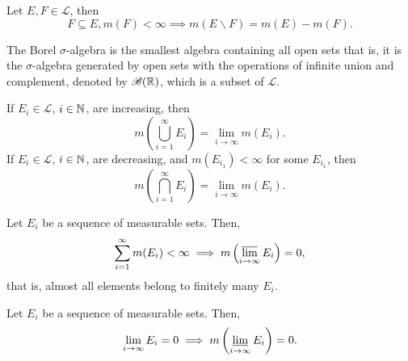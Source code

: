 \documentclass[class=book, crop=false]{standalone}
\begin{document}
    \begin{theorem}[Subtraction]
        Let $E, F \in \mathscr{L}$, then
        \begin{equation*}
            F \subseteq E, m(F) < \infty \implies m(E \backslash F) = m(E) - m(F).
        \end{equation*}
    \end{theorem}
    
    \begin{definition}
        The Borel $\sigma$-algebra is the smallest algebra containing all open sets that is, it is the $\sigma$-algebra generated by open sets with the operations of infinite union and complement, denoted by $\mathscr{B}(\mathbb{R})$, which is a subset of $\mathscr{L}$.
    \end{definition}

    \begin{theorem}[Continuity]
        If $E_i \in \mathscr{L}$, $i \in \mathbb{N}$, are increasing, then
        \begin{equation*}
            m\left(\bigcup^{\infty}_{i = 1} E_i\right) = \lim_{i \rightarrow \infty} m(E_i).
        \end{equation*}
        If $E_i \in \mathscr{L}$, $i \in \mathbb{N}$, are decreasing, and $m(E_{i_1}) < \infty$ for some $E_{i_1}$, then
        \begin{equation*}
            m\left(\bigcap^{\infty}_{i = 1} E_i\right) = \lim_{i \rightarrow \infty} m(E_i).
        \end{equation*}
    \end{theorem}

    \begin{theorem}
        Let $E_i$ be a sequence of measurable sets. Then,
        \begin{equation*}
            \sum^{\infty}_{i = 1} m(E_i) < \infty \implies m\left(\varlimsup_{i \rightarrow \infty} E_i\right) = 0,
        \end{equation*}
        that is, almost all elements belong to finitely many $E_i$.
    \end{theorem}

    \begin{theorem}
        Let $E_i$ be a sequence of measurable sets. Then,
        \begin{equation*}
            \lim_{i \rightarrow \infty} E_i = 0 \implies m\left(\varliminf_{i \rightarrow \infty} E_i\right) = 0.
        \end{equation*}
    \end{theorem}
    
\end{document}
